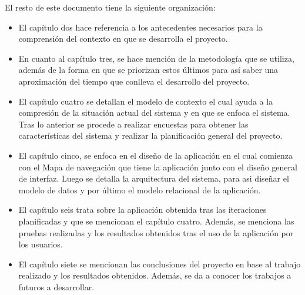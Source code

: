 El resto de este documento tiene la siguiente organización:

\begin{itemize}
    \item El capítulo dos hace referencia a los antecedentes necesarios para la comprensión del contexto en que se desarrolla el proyecto.
    \item En cuanto al capítulo tres, se hace mención de la metodología que se utiliza, además de la forma en que se priorizan estos últimos para así saber una aproximación del tiempo que conlleva el desarrollo del proyecto.
    \item El capítulo cuatro se detallan el modelo de contexto el cual ayuda a la compresión de la situación actual del sistema y en que se enfoca el sistema. Tras lo anterior se procede a realizar encuestas para obtener las características del sistema y realizar la planificación general del proyecto.
    \item El capítulo cinco, se enfoca en el diseño de la aplicación en el cual comienza con el Mapa de navegación que tiene la aplicación junto con el diseño general de interfaz. Luego se detalla la arquitectura del sistema, para asi diseñar el modelo de datos y por último el modelo relacional de la aplicación.
    \item El capítulo seis trata sobre la aplicación obtenida tras las iteraciones planificadas y que se mencionan el capítulo cuatro. Además, se menciona las pruebas realizadas y los resultados obtenidos tras el uso de la aplicación por los usuarios.
    \item El capítulo siete se mencionan las conclusiones del proyecto en base al trabajo realizado y los resultados obtenidos. Además, se da a conocer los trabajos a futuros a desarrollar.
\end{itemize}